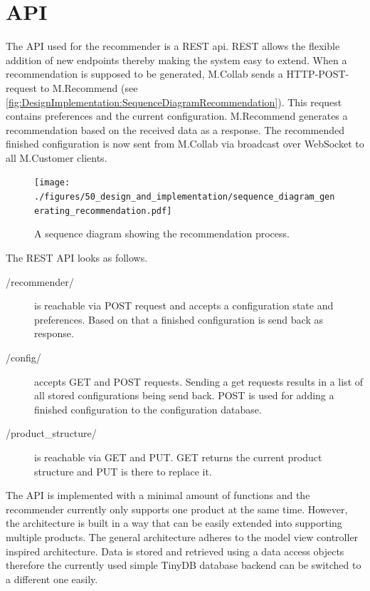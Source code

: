 \section{API}
\label{sec:DesignImplementation:API}

The API used for the recommender is a REST api. REST allows the flexible addition of new endpoints thereby making the system easy to extend.
When a recommendation is supposed to be generated, M.Collab sends a HTTP-POST-request to M.Recommend (see \autoref{fig:DesignImplementation:SequenceDiagramRecommendation}). This request contains preferences and the current configuration. M.Recommend generates a recommendation based on the received data as a response. The recommended finished configuration is now sent from  M.Collab via broadcast over WebSocket to all M.Customer clients. 

\begin{figure}
    \centering
    \texttt{[image: ./figures/50\_design\_and\_implementation/sequence\_diagram\_generating\_recommendation.pdf]}
    \caption{A sequence diagram showing the recommendation process.}
    \label{fig:DesignImplementation:SequenceDiagramRecommendation}
\end{figure}

The REST API looks as follows.

\begin{description}
    \item[/recommender/] is reachable via POST request and accepts a configuration state and preferences. Based on that a finished configuration is send back as response.
    \item[/config/] accepts GET and POST requests. Sending a get requests results in a list of all stored configurations being send back. POST is used for adding a finished configuration to the configuration database.
    \item[/product\_structure/] is reachable via GET and PUT. GET returns the current product structure and PUT is there to replace it.
\end{description}

The API is implemented with a minimal amount of functions and the recommender currently only supports one product at the same time. However, the architecture is built in a way that can be easily extended into supporting multiple products.
The general architecture adheres to the model view controller inspired architecture.
Data is stored and retrieved using a data access objects therefore the currently used simple TinyDB database backend can be switched to a different one easily.

